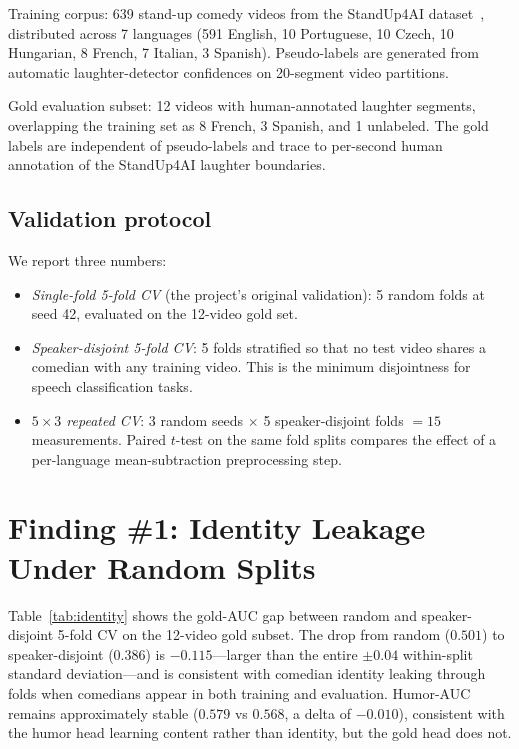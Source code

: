 \documentclass[11pt, letterpaper]{article}
\begin{document}
Training corpus: 639 stand-up comedy videos from the StandUp4AI
dataset~\cite{standup4ai}, distributed across 7 languages (591 English, 10
Portuguese, 10 Czech, 10 Hungarian, 8 French, 7 Italian, 3 Spanish).
Pseudo-labels are generated from automatic laughter-detector confidences on
20-segment video partitions.

Gold evaluation subset: 12 videos with human-annotated laughter segments,
overlapping the training set as 8 French, 3 Spanish, and 1 unlabeled. The
gold labels are independent of pseudo-labels and trace to per-second human
annotation of the StandUp4AI laughter boundaries.

\subsection{Validation protocol}

We report three numbers:

\begin{itemize}
\item \emph{Single-fold 5-fold CV} (the project's original validation):
5 random folds at seed 42, evaluated on the 12-video gold set.
\item \emph{Speaker-disjoint 5-fold CV}: 5 folds stratified so that no test
video shares a comedian with any training video. This is the minimum
disjointness for speech classification tasks.
\item \emph{$5\times3$ repeated CV}: 3 random seeds $\times$ 5 speaker-disjoint
folds $= 15$ measurements. Paired $t$-test on the same fold splits compares
the effect of a per-language mean-subtraction preprocessing step.
\end{itemize}

\section{Finding \#1: Identity Leakage Under Random Splits}
\label{sec:identity}

Table~\ref{tab:identity} shows the gold-AUC gap between random and
speaker-disjoint 5-fold CV on the 12-video gold subset. The drop from random
($0.501$) to speaker-disjoint ($0.386$) is $-0.115$---larger than the entire
$\pm 0.04$ within-split standard deviation---and is consistent with comedian
identity leaking through folds when comedians appear in both training and
evaluation. Humor-AUC remains approximately stable ($0.579$ vs $0.568$, a
delta of $-0.010$), consistent with the humor head learning content rather
than identity, but the gold head does not.
\end{document}
